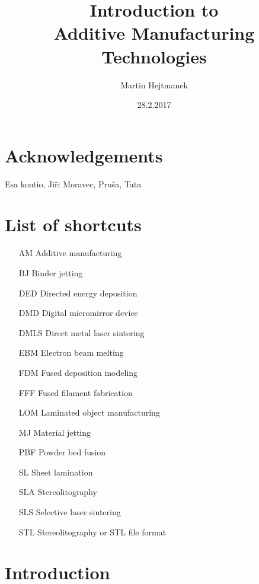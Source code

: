\documentclass[a4paper, twoside, 11pt]{report}
\begin{document}
%
\begin{titlepage}
\title{Introduction to\\Additive Manufacturing Technologies}
\author{Martin Hejtmanek}
\date{28.2.2017}
\maketitle
\end{titlepage}
%
\chapter*{Acknowledgements}
Esa kontio, Jiři Moravec, Pruša, Tata

\chapter*{List of shortcuts}
\begin{itemize}
\item[AM]Additive manufacturing
\item[BJ]Binder jetting
\item[DED]Directed energy deposition
\item[DMD]Digital micromirror device
\item[DMLS]Direct metal laser sintering
\item[EBM]Electron beam melting
\item[FDM]Fused deposition modeling
\item[FFF]Fused filament fabrication
\item[LOM]Laminated object manufacturing
\item[MJ]Material jetting
\item[PBF]Powder bed fusion
\item[SL]Sheet lamination
\item[SLA]Stereolitography
\item[SLS]Selective laser sintering
\item[STL]Stereolitography or STL file format
\end{itemize}


\chapter{Introduction}
%
%
%
\end{document}
